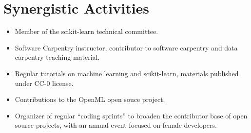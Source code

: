 \documentclass[11pt,letterpaper]{article}
\begin{document}
\section*{Synergistic Activities}
\begin{itemize}
\item Member of the scikit-learn technical committee.
\item Software Carpentry instructor, contributor to software carpentry and data
    carpentry teaching material.
\item Regular tutorials on machine learning and scikit-learn, materials published under CC-0 license.
\item Contributions to the OpenML open souce project.
\item Organizer of regular ``coding sprints'' to broaden the contributor base of open source projects, with an annual event focused on female developers.
\end{itemize}
\end{document}
